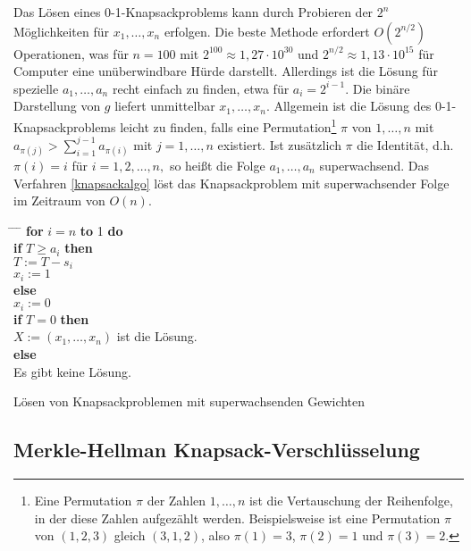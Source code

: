 \begin{refsegment}
Das Lösen eines 0-1-Knapsackproblems kann durch Probieren der $ 2^n $   Möglichkeiten für $ x_1, \dots, x_n $   erfolgen. Die beste Methode erfordert $ O(2^{n/2}) $  Operationen, was für $ n=100 $  mit $ 2^{100} \approx 1,27 \cdot 10^{30} $  und  $ 2^{n/2} \approx 1,13 \cdot 10^{15} $ für Computer eine unüberwindbare Hürde darstellt.
Allerdings ist die Lösung für spezielle $ a_1, \dots, a_n $   recht einfach zu finden, etwa für $ a_i = 2^{i-1}. $  Die binäre Darstellung von $ g $ liefert unmittelbar $ x_1, \dots, x_n$. Allgemein ist die Lösung des 0-1-Knapsackproblems leicht zu finden, falls eine  Permutation\footnote{%
  Eine Permutation $\pi$ der Zahlen $1, \dots, n$ ist die
  Vertauschung der Reihenfolge, in der diese Zahlen aufgezählt werden.
  Beispielsweise ist eine Permutation $\pi$ von $(1,2,3)$ gleich $(3,1,2)$,
  also $\pi(1) = 3$, $\pi(2) = 1$ und $\pi(3) = 2$.
}
$ \pi $  von $ 1, \dots, n $  mit $ a_{\pi (j)} > \sum_{i=1}^{j-1} a_{\pi(i)} $
mit $ j =  1, \dots, n $ existiert.
Ist zusätzlich $ \pi $ die Identität, d.h. $ \pi(i)=i $ für $ i=1,2,\dots,n, $ so heißt die Folge $ a_1, \dots , a_n $ superwachsend.
Das Verfahren \ref{knapsackalgo} löst das Knapsackproblem mit superwachsender Folge im Zeitraum von $ O(n). $
\begin{cryptoprocedure}
\begin{tabbing}
\hspace*{0.5cm} \= \hspace*{0.5cm} \= \hspace*{0.5cm} \= \kill
\>\textbf{for} $ i=n $ \textbf{to} 1 \textbf{do}\\
\>\> \textbf{if} $ T\geq a_i $ \textbf{then}\\
\>\> \> $ T:=T-s_i $\\
\>\>\> $ x_i:=1 $\\
\>\> \textbf{else}\\
\>\>\> $ x_i:=0 $\\
\>\textbf{if} $ T=0 $ \textbf{then}\\
\>\> $ X:=(x_1, \dots, x_n) $ ist die Lösung.\\
\>\textbf{else}\\
\>\> Es gibt keine Lösung.
\end{tabbing}
\caption{Lösen von Knapsackproblemen mit superwachsenden Gewichten}
\label{knapsackalgo}
\end{cryptoprocedure}


\subsection{Merkle-Hellman Knapsack-Verschlüsselung}
 


\end{refsegment}
